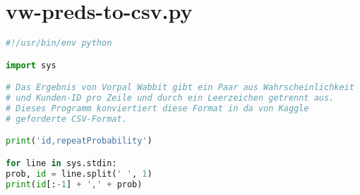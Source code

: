 \section{vw-preds-to-csv.py}
\label{code:vw-preds-to-csv}
\begin{lstlisting}[language=Python]
#!/usr/bin/env python

import sys

# Das Ergebnis von Vorpal Wabbit gibt ein Paar aus Wahrscheinlichkeit
# und Kunden-ID pro Zeile und durch ein Leerzeichen getrennt aus.
# Dieses Programm konviertiert diese Format in da von Kaggle
# geforderte CSV-Format.

print('id,repeatProbability')

for line in sys.stdin:
prob, id = line.split(' ', 1)
print(id[:-1] + ',' + prob)
\end{lstlisting}
	
	